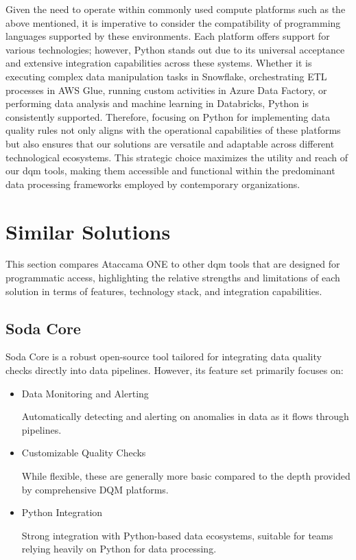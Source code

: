 Given the need to operate within commonly used compute platforms such as the above mentioned, it is imperative to consider the compatibility of programming languages supported by these environments. Each platform offers support for various technologies; however, Python stands out due to its universal acceptance and extensive integration capabilities across these systems. Whether it is executing complex data manipulation tasks in Snowflake, orchestrating ETL processes in AWS Glue, running custom activities in Azure Data Factory, or performing data analysis and machine learning in Databricks, Python is consistently supported. Therefore, focusing on Python for implementing data quality rules not only aligns with the operational capabilities of these platforms but also ensures that our solutions are versatile and adaptable across different technological ecosystems. This strategic choice maximizes the utility and reach of our \acrshort{dqm} tools, making them accessible and functional within the predominant data processing frameworks employed by contemporary organizations.

\section{Similar Solutions}

This section compares Ataccama ONE to other \acrshort{dqm} tools that are designed for programmatic access, highlighting the relative strengths and limitations of each solution in terms of features, technology stack, and integration capabilities.

\subsection{Soda Core}

Soda Core is a robust open-source tool tailored for integrating data quality checks directly into data pipelines. However, its feature set primarily focuses on:

\begin{itemize}
    \item Data Monitoring and Alerting
    
    Automatically detecting and alerting on anomalies in data as it flows through pipelines.

    \item Customizable Quality Checks

    While flexible, these are generally more basic compared to the depth provided by comprehensive DQM platforms.

    \item Python Integration
    
    Strong integration with Python-based data ecosystems, suitable for teams relying heavily on Python for data processing.
\end{itemize}

